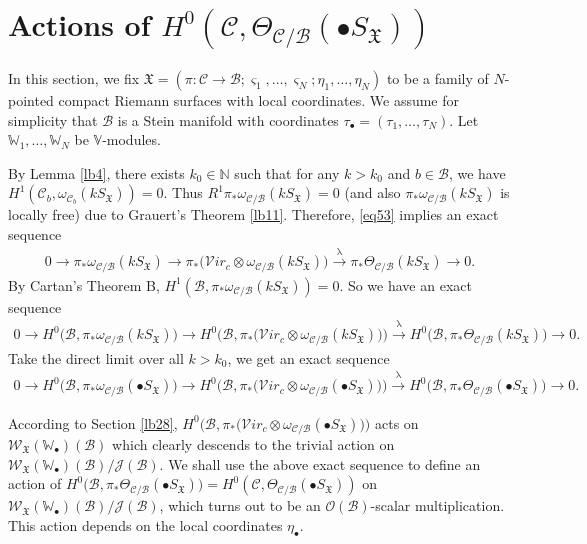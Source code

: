 \documentclass[11pt,b5paper,notitlepage]{article}
\theoremstyle{definition}
\theoremstyle{plain}
\newcommand{\fk}{\mathfrak}
\newcommand{\mc}{\mathcal}
\newcommand{\scr}{\mathscr}
\newcommand{\sgm}{\varsigma}
\newcommand{\SX}{S_{\fk X}}
\newcommand{\blt}{\bullet}
\newcommand{\Vbb}{\mathbb V}
\newcommand{\Wbb}{\mathbb W}
\newcommand{\Nbb}{\mathbb N}
\newcommand{\svir}{\mathcal V\!\mathit{ir}}
\numberwithin{equation}{section}
\begin{document}
\section{Actions of $H^0(\mc C,\Theta_{\mc C/\mc B}(\blt\SX))$}\label{lb41}



In this section, we fix  $\fk X=(\pi:\mc C\rightarrow\mc B;\sgm_1,\dots,\sgm_N;\eta_1,\dots,\eta_N)$ to be a family of $N$-pointed compact Riemann surfaces with local coordinates. We assume for simplicity that $\mc B$ is a Stein manifold with coordinates $\tau_\blt=(\tau_1,\dots,\tau_N)$. Let $\Wbb_1,\dots,\Wbb_N$ be $\Vbb$-modules. 

By Lemma \ref{lb4},  there exists $k_0\in\Nbb$ such that for any $k>k_0$ and $b\in \mc B$, we have $H^1(\mc C_b,\omega_{\mc C_b}(kS_{\fk X}))=0$. Thus $R^1\pi_*\omega_{\mc C/\mc B}(kS_{\fk X})=0$ (and also $\pi_*\omega_{\mc C/\mc B}(kS_{\fk X})$ is locally free) due to Grauert's Theorem \ref{lb11}. Therefore, \eqref{eq53} implies an exact sequence
\begin{align*}
0\rightarrow \pi_*\omega_{\mc C/\mc B}(k\SX) \rightarrow \pi_*\big(\svir_c\otimes \omega_{\mc C/\mc B}(k\SX)\big)\xrightarrow{\uplambda}   \pi_*\Theta_{\mc C/\mc B}(k\SX)\rightarrow 0.
\end{align*}
By Cartan's Theorem B, $H^1(\mc B,\pi_*\omega_{\mc C/\mc B}(k\SX))=0$. So we have an exact sequence
\begin{align*}
0\rightarrow H^0\big(\mc B,\pi_*\omega_{\mc C/\mc B}(k\SX)\big) \rightarrow H^0\big(\mc B,\pi_*\big(\svir_c\otimes \omega_{\mc C/\mc B}(k\SX)\big)\big)\xrightarrow{\uplambda}   H^0\big(\mc B,\pi_*\Theta_{\mc C/\mc B}(k\SX)\big)\rightarrow 0.
\end{align*}
Take the direct limit over all $k>k_0$, we get an exact sequence
\begin{align}
0\rightarrow H^0\big(\mc B,\pi_*\omega_{\mc C/\mc B}(\blt\SX)\big) \rightarrow H^0\big(\mc B,\pi_*\big(\svir_c\otimes \omega_{\mc C/\mc B}(\blt\SX)\big)\big)\xrightarrow{\uplambda}   H^0\big(\mc B,\pi_*\Theta_{\mc C/\mc B}(\blt\SX)\big)\rightarrow 0.\label{eq78}
\end{align}



According to Section \ref{lb28}, $H^0\big(\mc B,\pi_*\big(\svir_c\otimes \omega_{\mc C/\mc B}(\blt\SX)\big)\big)$ acts on $\scr W_{\fk X}(\Wbb_\blt)(\mc B)$ which clearly descends to the trivial action on $\scr W_{\fk X}(\Wbb_\blt)(\mc B)/\scr J(\mc B)$. We shall use the above exact sequence to define an action of $H^0\big(\mc B,\pi_*\Theta_{\mc C/\mc B}(\blt\SX)\big)=H^0(\mc C,\Theta_{\mc C/\mc B}(\blt\SX))$ on $\scr W_{\fk X}(\Wbb_\blt)(\mc B)/\scr J(\mc B)$, which turns out to be an $\scr O(\mc B)$-scalar multiplication. This action depends on the local coordinates $\eta_\blt$.
\end{document}
